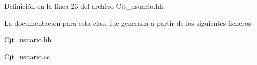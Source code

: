 Definición en la línea 23 del archivo Cjt\+\_\+usuario.\+hh.



La documentación para esta clase fue generada a partir de los siguientes ficheros\+:\begin{DoxyCompactItemize}
\item 
\mbox{\hyperlink{_cjt__usuario_8hh}{Cjt\+\_\+usuario.\+hh}}\item 
\mbox{\hyperlink{_cjt__usuario_8cc}{Cjt\+\_\+usuario.\+cc}}\end{DoxyCompactItemize}
